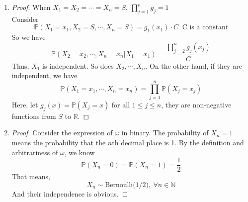 \documentclass{article}
\begin{document}
\begin{enumerate}
        \item \begin{proof}
            When $X_1=X_2=\cdots=X_n=S$, $\prod_{j=1}^n g_j =1$\\
            Consider
            $$\mathbb{P}\left(X_1=x_1, X_2 = S, \cdots, X_n=S\right)
            =g_1(x_1) \cdot C \ \text{    C is a constant}$$
            So we have
            $$\mathbb{P}\left(X_2 = x_2, \cdots, X_n=x_n|X_1=x_1\right)
            =\frac{\prod_{j=2}^n g_j(x_j)}{C}$$
            Thus, $X_1$ is independent.
            So does $X_2, \cdots, X_n$.
            On the other hand, if they are independent, we have
            $$\mathbb{P}\left(X_1=x_1, \cdots, X_n=x_n\right)
            =\prod_{j=1}^n \mathbb{P}\left(X_j=x_j\right)$$
            Here, let $g_j(x) = \mathbb{P}\left(X_j=x\right)$ for all $1\leqslant j \leqslant n$, they are non-negative functions from $S$ to $\mathbb{R}$.
        \end{proof}

        \item \begin{proof}
            Consider the expression of $\omega$ in binary. The probability of $X_n=1$
            means the probability that the $n$th decimal place is 1.
            By the definition and arbitrariness of $\omega$, we know
            $$\mathbb{P}\left(X_n=0\right)=\mathbb{P}\left(X_n=1\right)=\frac{1}{2}$$
            That means, $$X_n \sim \text{Bernoulli(1/2)}, \ \forall n\in \mathbb{N}$$
            And their independence is obvious.
        \end{proof}
    
    \end{enumerate}
\end{document}
